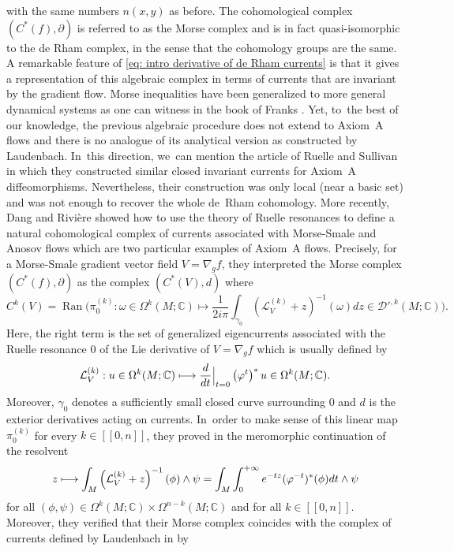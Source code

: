 \documentclass[11pt]{article}
\newcommand\mto{\mathchoice{\longmapsto}{\mapsto}{\mapsto}{\mapsto}}
\newcommand{\lcr}{[\![}
\newcommand{\rcr}{]\!]}
\theoremstyle{definition}
\theoremstyle{plain}
\newcommand{\C}{\mathbb{C}}
\newcommand{\D}{\mathcal{D}}
\newcommand{\Lie}{\mathcal{L}}
\DeclareMathOperator{\Ran}{Ran}
\def\rest#1#2{\mathchoice
{\setbox1\hbox{${\displaystyle #1}_{\scriptstyle #2}$}
\restrictionaux{#1}{#2}}
{\setbox1\hbox{${\textstyle #1}_{\scriptstyle #2}$}
\restrictionaux{#1}{#2}}
{\setbox1\hbox{${\scriptstyle #1}_{\scriptscriptstyle #2}$}
\restrictionaux{#1}{#2}}
{\setbox1\hbox{${\scriptscriptstyle #1}_{\scriptscriptstyle #2}$}
\restrictionaux{#1}{#2}}}
\def\restrictionaux#1#2{{#1\,\smash{\vrule height.8\ht1 depth.85\dp1}}_{\,#2}}
\begin{document}
with the same numbers $n(x,y)$ as before. The cohomological complex $(C^*(f),\partial)$ is referred to as the Morse complex and is in fact quasi-isomorphic to the de Rham complex, in the sense that the cohomology groups are the same. A remarkable feature of \eqref{eq: intro derivative of de Rham currents} is that it gives a representation of this algebraic complex in terms of currents that are invariant by the gradient flow. Morse inequalities have been generalized to more general dynamical systems as one can witness in the book of Franks \cite{franks_homology}. Yet, to~the best of our knowledge, the previous algebraic procedure does not extend to Axiom~A flows and there is no analogue of its analytical version as constructed by Laudenbach. In~this direction, we~can mention the article of Ruelle and Sullivan~\cite{ruelle-sullivan} in which they constructed similar closed invariant currents for Axiom~A diffeomorphisms. Nevertheless, their construction was only local (near a basic set) and was not enough to recover the whole de~Rham cohomology. More recently, Dang and Rivière showed how to use the theory of Ruelle resonances \cite{DR0} to define a natural cohomological complex of currents associated with Morse-Smale and Anosov flows which are two particular examples of Axiom~A flows. Precisely, for a Morse-Smale gradient vector field $V = \nabla_g f$, they interpreted the Morse complex $(C^* (f),\partial)$ as the complex $(C^* (V),d)$ where
\begin{equation}\label{eq: intro def Morse complex}
C^k (V) = \Ran \biggl(\pi_0^{(k)}: \omega \!\in\! \Omega^{k} (M; \C) \mapsto \frac{1}{2 i \pi} \int_{\gamma_0}(\Lie_{V}^{(k)} + z)^{-1} (\omega) dz \in \D'^{,k} (M;\C) \biggr).
\end{equation}
Here, the right term is the set of generalized eigencurrents associated with the Ruelle resonance $0$ of the Lie derivative of $V = \nabla_g f$ which is usually defined by
\[
\Lie_V^{(k)}: u \in \Omega^k (M;\C) \mto \rest{\frac{d}{dt}}{t= 0} \left(\varphi^t \right)^* u \in \Omega^k (M;\C).
\]
Moreover, $\gamma_0$ denotes a sufficiently small closed curve surrounding $0$ and $d$ is the exterior derivatives acting on currents. In~order to make sense of this linear map $\pi_0^{(k)}$ for every $k\in\lcr0,n\rcr$, they proved in \cite[Prop.\,4.2]{DR0} the meromorphic continuation of the resolvent
\[
z \mto \int_M \left(\Lie_{V}^{(k)} + z \right)^{-1} (\phi) \wedge \psi = \int_M \int_0^{+\infty} e^{-tz} (\varphi^{-t})^*(\phi) dt \wedge \psi
\]
for all $(\phi, \psi) \in \Omega^k (M;\C) \times \Omega^{n-k} (M;\C)$ and for all $k\in\lcr0,n\rcr$. Moreover, they verified that their Morse complex coincides with the complex of currents defined by Laudenbach in \cite{laudenbach} by
\end{document}
